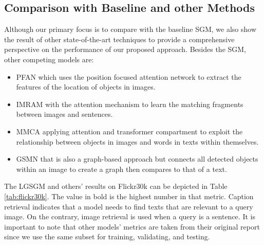 \documentclass{IOS-Book-Article}
\begin{document}
\subsection{Comparison with Baseline and other Methods}
Although our primary focus is to compare with the baseline SGM, we also show the result of other state-of-the-art techniques to provide a comprehensive perspective on the performance of our proposed approach. Besides the SGM, other competing models are:
\begin{itemize}
    \item PFAN \cite{wang2019position} which uses the position focused attention network to extract the features of the location of objects in images.
    \item IMRAM \cite{chen2020imram} with the attention mechanism to learn the matching fragments between images and sentences.
    \item MMCA \cite{wei2020multi} applying attention and transformer compartment to exploit the relationship between objects in images and words in texts within themselves.
    \item GSMN \cite{liu2020graph} that is also a graph-based approach but connects all detected objects within an image to create a graph then compares to that of a text.
\end{itemize}

The LGSGM and others' results on Flickr30k can be depicted in Table \ref{tab:flickr30k}. The value in bold is the highest number in that metric. Caption retrieval indicates that a model needs to find texts that are relevant to a query image. On the contrary, image retrieval is used when a query is a sentence. It is important to note that other models' metrics are taken from their original report since we use the same subset for training, validating, and testing.
\end{document}
